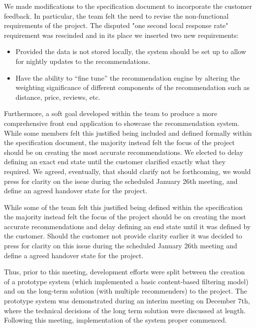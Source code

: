 \documentclass{l3proj}
\begin{document}
We made modifications to the specification document to incorporate the customer feedback. In particular, the team felt the need to revise the non-functional requirements of the project. The disputed "one second local response rate" requirement was rescinded and in its place we inserted two new requirements:

\begin{itemize}
\item Provided the data is not stored locally, the system should be set up to allow for nightly updates to the recommendations.
\item Have the ability to “fine tune” the recommendation engine by altering the weighting significance of different components of the recommendation such as distance, price, 
reviews, etc.
\end{itemize}

Furthermore, a soft goal developed within the team to produce a more comprehensive front end application to showcase the recommendation system. While some members felt this justified being included and defined formally within the specification document, the majority instead felt the focus of the project should be on creating the most accurate recommendations. We elected to delay defining an exact end state until the customer clarified exactly what they required. We agreed, eventually, that should clarify not be forthcoming, we would press for clarity on the issue during the scheduled January 26th meeting, and define an agreed handover state for the project. 

While some of the team felt this justified being defined within the specification the majority instead felt the focus of the project should be on creating the most accurate recommendations and delay defining an end state until it was defined by the customer. Should the customer not provide clarity earlier it was decided to press for clarity on this issue during the scheduled January 26th meeting and define a agreed handover state for the project. 

Thus, prior to this meeting, development efforts were split between the creation of a prototype system (which implemented a basic content-based filtering model) and on the long-term solution (with multiple recommenders) to the project. The prototype system was demonstrated during an interim meeting on December 7th, where the technical decisions of the long term solution were discussed at length. Following this meeting, implementation of the system proper commenced. 
\end{document}
